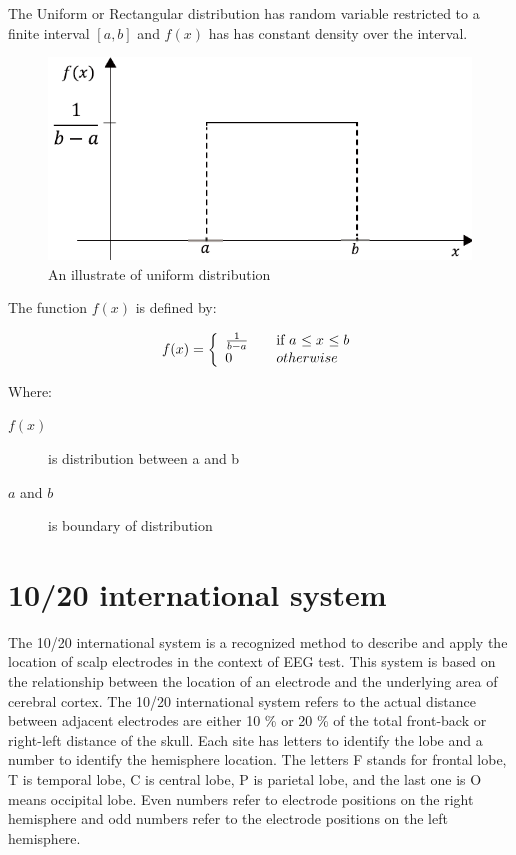 \hspace{1.5cm} The Uniform or Rectangular distribution has random variable  restricted to a finite interval $[a,b]$ and $f(x)$ has  has constant density over the interval.

\begin{figure}[ht]
	\centering
	\includegraphics[scale = 0.8]{chapter3/34.pdf}
	\caption{An illustrate of uniform distribution}
\end{figure}

The function $f(x)$ is defined by:

\begin{equation}\label{2}
f(x) = \left\{ 
\begin{array}{l l}
  {1 \over b-a} & \quad \mbox{if $a$ $\leq x$ $\leq b$}\\
  0 & \quad \mbox{$otherwise$}\\ \end{array} \right.
\end{equation}

Where:
\begin{description}
	\item [$f(x)$] is distribution between a and b
	\item [$a$ and $b$] is boundary of distribution
\end{description}

\section{10/20 international system}
\hspace{1.5cm} The 10/20 international system is a recognized method to describe and apply the location of scalp electrodes in the context of EEG test. This system is based on the relationship between the location of an electrode and the underlying area of cerebral cortex. The 10/20 international system refers to the actual distance between adjacent electrodes are either 10 \% or 20 \% of the total front-back or right-left distance of the skull. Each site has letters to identify the lobe and a number to identify the hemisphere location. The letters F stands for frontal lobe, T is temporal lobe, C is central lobe, P is parietal lobe, and the last one is O means occipital lobe. Even numbers refer to electrode positions on the right hemisphere and odd numbers refer to the electrode positions on the left hemisphere.

